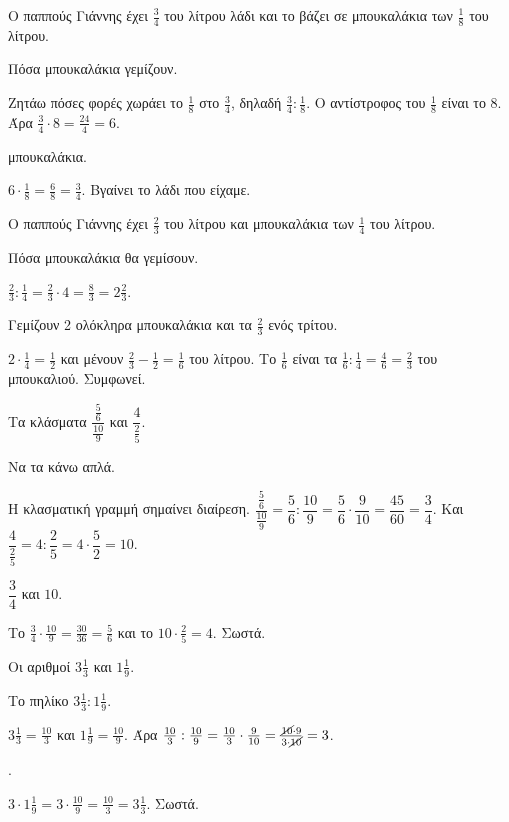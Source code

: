 
\tixero Ο παππούς Γιάννης έχει $\frac{3}{4}$ του λίτρου λάδι και το βάζει σε μπουκαλάκια των $\frac{1}{8}$ του λίτρου.\par
\tithelo Πόσα μπουκαλάκια γεμίζουν.\par
\possindeo Ζητάω πόσες φορές χωράει το $\frac{1}{8}$ στο $\frac{3}{4}$, δηλαδή $\frac{3}{4}:\frac{1}{8}$. Ο αντίστροφος του $\frac{1}{8}$ είναι το 8. Άρα $\frac{3}{4}\cdot 8=\frac{24}{4}=6$.\par
{} μπουκαλάκια.\par
\elegxos $6\cdot\frac{1}{8}=\frac{6}{8}=\frac{3}{4}$. Βγαίνει το λάδι που είχαμε.

\tixero Ο παππούς Γιάννης έχει $\frac{2}{3}$ του λίτρου και μπουκαλάκια των $\frac{1}{4}$ του λίτρου.\par
\tithelo Πόσα μπουκαλάκια θα γεμίσουν.\par
\possindeo $\frac{2}{3}:\frac{1}{4}=\frac{2}{3}\cdot 4=\frac{8}{3}=2\frac{2}{3}$.\par
\apantisi Γεμίζουν 2 ολόκληρα μπουκαλάκια και τα $\frac{2}{3}$ ενός τρίτου.\par
\elegxos $2\cdot\frac{1}{4}=\frac{1}{2}$ και μένουν $\frac{2}{3}-\frac{1}{2}=\frac{1}{6}$ του λίτρου. Το $\frac{1}{6}$ είναι τα $\frac{1}{6}:\frac{1}{4}=\frac{4}{6}=\frac{2}{3}$ του μπουκαλιού. Συμφωνεί.

\tixero Τα κλάσματα $\dfrac{\frac{5}{6}}{\frac{10}{9}}$ και $\dfrac{4}{\frac{2}{5}}$.\par
\tithelo Να τα κάνω απλά.\par
\possindeo Η κλασματική γραμμή σημαίνει διαίρεση. $\dfrac{\frac{5}{6}}{\frac{10}{9}}=\dfrac{5}{6}:\dfrac{10}{9}=\dfrac{5}{6}\cdot\dfrac{9}{10}=\dfrac{45}{60}=\dfrac{3}{4}$. Και $\dfrac{4}{\frac{2}{5}}=4:\dfrac{2}{5}=4\cdot\dfrac{5}{2}=10$.\par
\apantisi $\dfrac{3}{4}$ και $10$.\par
\elegxos Το $\frac{3}{4}\cdot\frac{10}{9}=\frac{30}{36}=\frac{5}{6}$ και το $10\cdot\frac{2}{5}=4$. Σωστά.

\tixero Οι αριθμοί $3\frac{1}{3}$ και $1\frac{1}{9}$.\par
\tithelo Το πηλίκο $3\frac{1}{3}:1\frac{1}{9}$.\par
\possindeo $3\frac{1}{3}=\frac{10}{3}$ και $1\frac{1}{9}=\frac{10}{9}$. Άρα $\frac{10}{3}:\frac{10}{9}=\frac{10}{3}\cdot\frac{9}{10}=\frac{\cancel{10}\cdot 9}{3\cdot\cancel{10}}=3$.\par
{}.\par
\elegxos $3\cdot 1\frac{1}{9}=3\cdot\frac{10}{9}=\frac{10}{3}=3\frac{1}{3}$. Σωστά.

